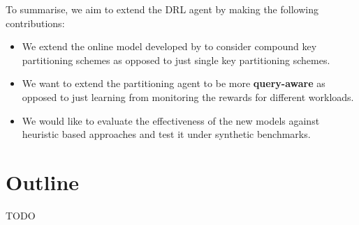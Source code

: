 To summarise, we aim to extend the DRL agent by making the following contributions:
\begin{itemize}
    \item We extend the online model developed by \citeauthor{Hilprecht:2019:TLP:3329859.3329876} to consider compound key partitioning schemes as opposed to just single key partitioning schemes.
    \item We want to extend the partitioning agent to be more \textbf{query-aware} as opposed to just learning from monitoring the rewards for different workloads.
    \item We would like to evaluate the effectiveness of the new models against heuristic based approaches and test it under synthetic benchmarks. 
\end{itemize}

\section{Outline}
TODO
